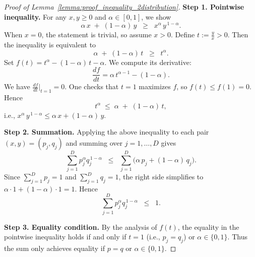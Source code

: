 \documentclass[11pt]{article}
\begin{document}
\begin{proof}[Proof of Lemma~\ref{lemma:proof_inequality_2distribution}]

\textbf{Step 1. Pointwise inequality.} 
For any $x,y \ge 0$ and $\alpha \in [0,1]$, we show
\[
\alpha\,x \;+\; (1-\alpha)\,y \;\;\ge\;\; x^{\alpha}\,y^{\,1-\alpha}.
\]
When $x = 0$, the statement is trivial, so assume $x > 0$. 
Define $t := \frac{y}{x} > 0$. Then the inequality is equivalent to
\[
\alpha \;+\; (1-\alpha)\,t \;\;\ge\;\; t^{\alpha}.
\]
Set $f(t) = t^{\alpha} - (1-\alpha)\,t - \alpha$. We compute its derivative:
\[
\frac{d f}{dt} = \alpha\,t^{\alpha-1} - (1-\alpha).
\]
We have $\frac{d f}{dt}\big|_{t=1} = 0$. One checks that $t=1$ maximizes $f$, 
so $f(t)\le f(1)=0$. Hence
\[
t^{\alpha} \;\le\; \alpha \;+\; (1-\alpha)\,t,
\]
i.e., $x^{\alpha}\,y^{\,1-\alpha} \le \alpha\,x + (1-\alpha)\,y$.

\textbf{Step 2. Summation.} 
Applying the above inequality to each pair $(x,y) = (p_j,q_j)$ and summing 
over $j=1,\ldots,D$ gives
\[
\sum_{j=1}^D p_j^{\alpha} q_j^{\,1-\alpha}
\;\;\le\;\;
\sum_{j=1}^D \bigl(\alpha\,p_j + (1-\alpha)\,q_j\bigr).
\]
Since $\sum_{j=1}^D p_j = 1$ and $\sum_{j=1}^D q_j = 1$, the right side 
simplifies to $\alpha \cdot 1 + (1-\alpha)\cdot 1 = 1$. Hence
\[
\sum_{j=1}^D p_j^{\alpha} q_j^{\,1-\alpha} \;\;\le\;\; 1.
\]

\textbf{Step 3. Equality condition.} 
By the analysis of $f(t)$, the equality in the pointwise inequality holds 
if and only if $t=1$ (i.e., $p_j = q_j$) or $\alpha \in \{0,1\}$. Thus the 
sum only achieves equality if $p=q$ or $\alpha\in\{0,1\}$. 
\end{proof}
\end{document}
